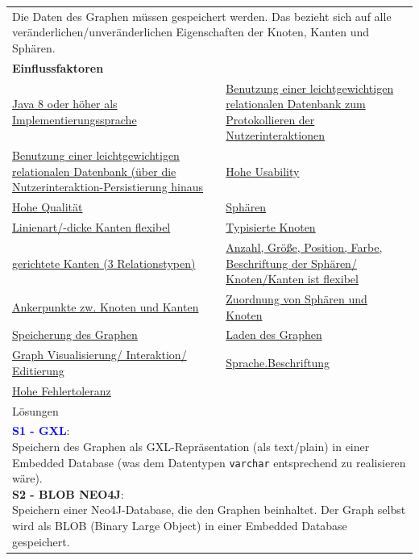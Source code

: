 \documentclass[enabledeprecatedfontcommands,fontsize=11pt,paper=a4,twoside]{scrartcl}
\newcounter{one}
\newcommand{\cb}[1]{{\textcolor{blue}{#1}}}
\begin{document}
\begin{tabular} {|p{8cm} p{8cm}|}
	\hline
	\rowcolor{prob}\multicolumn{2}{|l|}{\parbox{16cm}{\textbf{01: Datensicherung/Persistenz des Graphen}}} \\  \hline\hline 
	\multicolumn{2}{|l|}{\parbox{16cm}{Die Daten des Graphen müssen gespeichert werden. Das bezieht sich auf alle veränderlichen/unveränderlichen Eigenschaften der Knoten, Kanten und Sphären.}}\rule{0pt}{4ex}\\ [1ex] \hline
	\multicolumn{2}{|l|}{\textbf{Einflussfaktoren}}\\
	\hyperlink{b}{Java 8 oder höher als Implementierungssprache}  & \hyperlink {d}{Benutzung einer leichtgewichtigen relationalen Datenbank zum Protokollieren der Nutzerinteraktionen}\\ 
	\hyperlink {e}{Benutzung einer leichtgewichtigen relationalen Datenbank (über die Nutzerinteraktion-Persistierung hinaus} & \hyperlink {g}{Hohe Usability}\\
	\hyperlink {h}{Hohe Qualität} &
	\hyperlink {n}{Sphären} \\
	\hyperlink {o}{Linienart/-dicke Kanten flexibel}&
	\hyperlink {p}{Typisierte Knoten} \\
	\hyperlink {q}{gerichtete Kanten (3 Relationstypen)} &
	\hyperlink {r}{Anzahl, Größe, Position, Farbe, Beschriftung der Sphären/ Knoten/Kanten ist flexibel} \\
	\hyperlink {s}{Ankerpunkte zw. Knoten und Kanten} &
	\hyperlink {t}{Zuordnung von Sphären und Knoten} \\
	\hyperlink {v}{Speicherung des Graphen} &
	\hyperlink {w}{Laden des Graphen} \\
	\hyperlink {aa}{Graph Visualisierung/ Interaktion/ Editierung}&
	\hyperlink {hh}{Sprache.Beschriftung} \\
	\hyperlink {tt}{Hohe Fehlertoleranz} &
	\\ \hline
	\multicolumn{2}{|l|}{Lösungen} \\
	\multicolumn{2}{|l|}{\parbox{16cm}{
			\textbf{\cb{\hypertarget{yy}{S1 - GXL}}}: \\
			Speichern des Graphen als GXL-Repräsentation (als text/plain) in einer Embedded Database (was dem Datentypen \texttt{varchar} entsprechend zu realisieren wäre). \\
			\textbf{S2 - BLOB NEO4J}: \\
			Speichern einer Neo4J-Database, die den Graphen beinhaltet. Der Graph selbst wird als BLOB (Binary Large Object) in einer Embedded Database gespeichert. \\
}}
\end{tabular}
\end{document}
